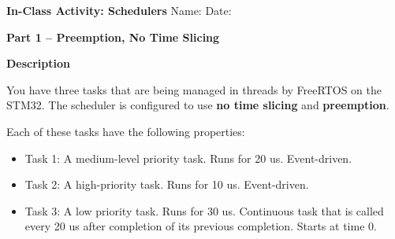 \documentclass[11pt]{article}
\newcommand{\taskbar}[4]{%
  \draw[fill=#4, draw=black!55] (#1,#3-0.32) rectangle (#2,#3+0.32);
}
\newcommand{\schedAxis}{%
  \foreach \t in {0,10,...,230} {
    \draw[gray!55, dash pattern=on 2pt off 2pt] (\t/10,0) -- (\t/10,4.6);
    \node[below, font=\scriptsize, gray!70] at (\t/10,0) {\t};
  }
  \node[anchor=east, font=\scriptsize, gray!70] at (-0.2,-0.5) {Time (us):};
  \node[anchor=east, font=\large] at (-0.3,4) {Task 1:};
  \node[anchor=east, font=\large] at (-0.3,3) {Task 2:};
  \node[anchor=east, font=\large] at (-0.3,2) {Task 3:};
  \node[anchor=east, font=\large] at (-0.3,1) {Idle:};
}
\begin{document}
{\Large\bfseries In-Class Activity: Schedulers}\hfill
Name: \underline{\hspace{6cm}}\quad Date: \underline{\hspace{2.5cm}}

\bigskip
\textbf{Part 1 -- Preemption, No Time Slicing}

\smallskip
\textbf{Description}

\smallskip
You have three tasks that are being managed in threads by FreeRTOS on the
STM32. The scheduler is configured to use \textbf{no time slicing} and
\textbf{preemption}.

\smallskip
Each of these tasks have the following properties:
\begin{itemize}
  \item Task 1: A medium-level priority task. Runs for 20 us. Event-driven.
  \item Task 2: A high-priority task. Runs for 10 us. Event-driven.
  \item Task 3: A low priority task. Runs for 30 us. Continuous task that is
    called every 20 us after completion of its previous completion. Starts
    at time 0.
\end{itemize}

\bigskip
\begin{center}
\end{center}
\end{document}
